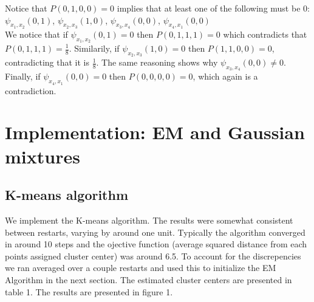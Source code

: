 \documentclass[paper=a4, fontsize=11pt]{scrartcl} %
\numberwithin{equation}{section} %
\numberwithin{figure}{section} %
\numberwithin{table}{section} %
\begin{document}
Notice that $P(0,1,0,0)=0$ implies that at least one of the following must be $0$:
$\psi_{x_1,x_2}(0,1)$,
$\psi_{x_2,x_3}(1,0)$,
$\psi_{x_3,x_4}(0,0)$,
$\psi_{x_4,x_1}(0,0)$
\\

We notice that if $\psi_{x_1,x_2}(0,1)=0$ then $P(0,1,1,1)=0$ which contradicts that $P(0,1,1,1)=\frac{1}{8}$. Similarily, if $\psi_{x_2,x_3}(1,0)=0$ then $P(1,1,0,0)=0$, contradicting that it is \(\frac{1}{8}\). The same reasoning shows why $\psi_{x_3,x_4}(0,0) \ne 0$. Finally, if $\psi_{x_4,x_1}(0,0)=0$ then $P(0,0,0,0)=0$, which again is a contradiction.

\label{key}

\newpage

\section{Implementation: EM and Gaussian mixtures}

\subsection{K-means algorithm}

We implement the K-means algorithm. The results were somewhat consistent between restarts, varying by around one unit. Typically the algorithm converged in around 10 steps and the ojective function (average squared distance from each points assigned cluster center) was around 6.5. To account for the discrepencies we ran averaged over a couple restarts and used this to initialize the EM Algorithm in the next section. The estimated cluster centers are presented in table 1. The results are presented in figure 1.
\end{document}

